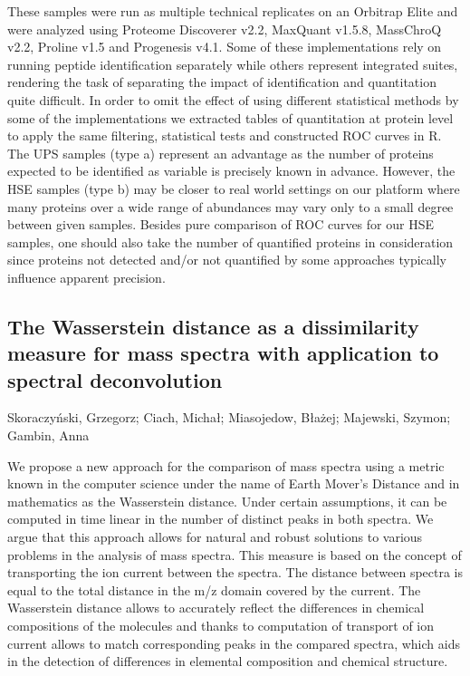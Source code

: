 {These samples were run as multiple technical replicates on an Orbitrap Elite and were analyzed using Proteome Discoverer v2.2, MaxQuant v1.5.8, MassChroQ v2.2, Proline v1.5 and Progenesis v4.1. Some of these implementations rely on running peptide identification separately while others represent integrated suites, rendering the task of separating the impact of identification and quantitation quite difficult. In order to omit the effect of using different statistical methods by some of the implementations we extracted tables of quantitation at protein level to apply the same filtering, statistical tests and constructed ROC curves in R. The UPS samples (type a) represent an advantage as the number of proteins expected to be identified as variable is precisely known in advance. However, the HSE samples (type b) may be closer to real world settings on our platform where many proteins over a wide range of abundances may vary only to a small degree between given samples. Besides pure comparison of ROC curves for our HSE samples, one should also take the number of quantified proteins in consideration since proteins not detected and/or not quantified by some approaches typically influence apparent precision.


\subsection*{\color{eubicRed} The Wasserstein distance as a dissimilarity measure for mass spectra with application to spectral deconvolution}
{\color{eubicGray} Skoraczyński, Grzegorz;
Ciach, Michał;
Miasojedow, Błażej;
Majewski, Szymon;
Gambin, Anna}

We propose a new approach for the comparison of mass spectra using a metric
known in the computer science under the name of Earth Mover’s Distance and in
mathematics as the Wasserstein distance. Under certain assumptions, it can be
computed in time linear in the number of distinct peaks in both spectra. We
argue that this approach allows for natural and robust solutions to various
problems in the analysis of mass spectra. This measure is based on the concept
of transporting the ion current between the spectra. The distance between
spectra is equal to the total distance in the m/z domain covered by the
current. The Wasserstein distance allows to accurately reflect the differences
in chemical compositions of the molecules and thanks to computation of
transport of ion current allows to match corresponding peaks in the compared
spectra, which aids in the detection of differences in elemental composition
and chemical structure.

}
